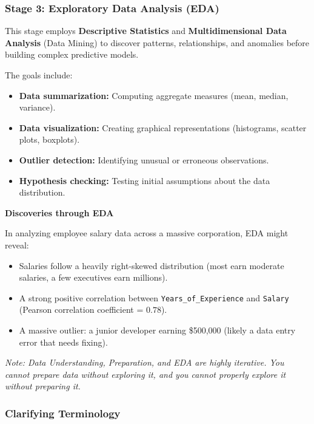 \subsubsection{Stage 3: Exploratory Data Analysis (EDA)}

This stage employs \textbf{Descriptive Statistics} and \textbf{Multidimensional Data Analysis} (Data Mining) to discover patterns, relationships, and anomalies before building complex predictive models. 

The goals include:
\begin{itemize}
    \item \textbf{Data summarization:} Computing aggregate measures (mean, median, variance).
    \item \textbf{Data visualization:} Creating graphical representations (histograms, scatter plots, boxplots).
    \item \textbf{Outlier detection:} Identifying unusual or erroneous observations.
    \item \textbf{Hypothesis checking:} Testing initial assumptions about the data distribution.
\end{itemize}

\vspace{0.15cm}
\begin{example}{\textbf{Discoveries through EDA}}

In analyzing employee salary data across a massive corporation, EDA might reveal:
\begin{itemize}
    \item Salaries follow a heavily right-skewed distribution (most earn moderate salaries, a few executives earn millions).
    \item A strong positive correlation between \texttt{Years\_of\_Experience} and \texttt{Salary} (Pearson correlation coefficient = $0.78$).
    \item A massive outlier: a junior developer earning \$500,000 (likely a data entry error that needs fixing).
\end{itemize}
\end{example}

\textit{Note: Data Understanding, Preparation, and EDA are highly iterative. You cannot prepare data without exploring it, and you cannot properly explore it without preparing it.}

\subsubsection{Clarifying Terminology}


